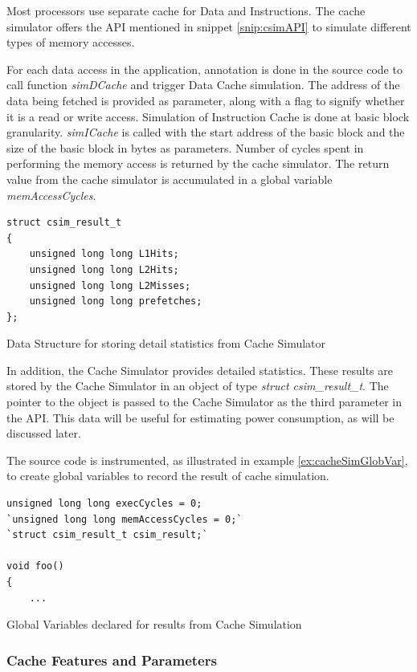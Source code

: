 Most processors use separate cache for Data and Instructions. The cache simulator offers the API mentioned in snippet \ref{snip:csimAPI} to simulate different types of memory accesses.

For each data access in the application, annotation is done in the source code to call function \emph{simDCache} and trigger Data Cache simulation. The address of the data being fetched is provided as parameter, along with a flag to signify whether it is a read or write access. Simulation of Instruction Cache is done at basic block granularity. \emph{simICache} is called with the start address of the basic block and the size of the basic block in bytes as parameters. Number of cycles spent in performing the memory access is returned by the cache simulator. The return value from the cache simulator is accumulated in a global variable \emph{memAccessCycles}. 

\begin{Snippet}[h!]
\begin{lstlisting}[numbers=none]
struct csim_result_t
{
	unsigned long long L1Hits;
	unsigned long long L2Hits;
	unsigned long long L2Misses;
	unsigned long long prefetches;
};
\end{lstlisting}
\caption{Data Structure for storing detail statistics from Cache Simulator}
\label{snip:csimAPI}
\end{Snippet}

In addition, the Cache Simulator provides detailed statistics. These results are stored by the Cache Simulator in an object of type \emph{struct csim\_result\_t}. The pointer to the object is passed to the Cache Simulator as the third parameter in the API. This data will be useful for estimating power consumption, as will be discussed later. 

The source code is instrumented, as illustrated in example \ref{ex:cacheSimGlobVar}, to create global variables to record the result of cache simulation.

\begin{Example}[h!]
\begin{lstlisting}
unsigned long long execCycles = 0;
`unsigned long long memAccessCycles = 0;`
`struct csim_result_t csim_result;`

void foo()
{
    ...
\end{lstlisting}
\caption{Global Variables declared for results from Cache Simulation}
\label{ex:cacheSimGlobVar}
\end{Example}

\pagebreak
\subsubsection{Cache Features and Parameters}

